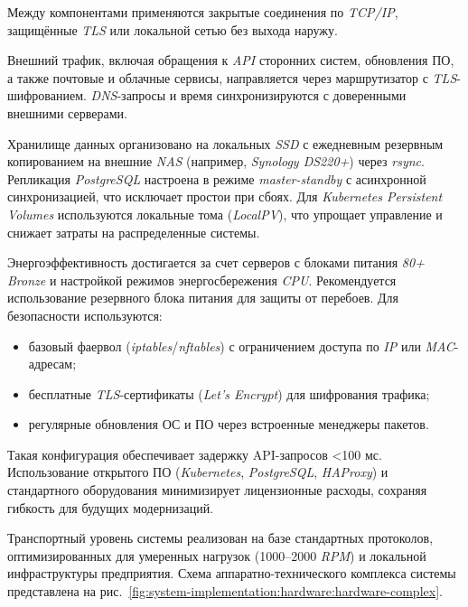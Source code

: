 Между компонентами применяются закрытые соединения по \textit{TCP/IP}, защищённые \textit{TLS} или локальной сетью без выхода наружу.

Внешний трафик, включая обращения к \textit{API} сторонних систем, обновления ПО, а также почтовые и облачные сервисы, направляется через маршрутизатор с \textit{TLS}-шифрованием. \textit{DNS}-запросы и время синхронизируются с доверенными внешними серверами.

Хранилище данных организовано на локальных \textit{SSD} с ежедневным резервным копированием на внешние \textit{NAS} (например, \textit{Synology DS220+}) через \textit{rsync}. Репликация \textit{PostgreSQL} настроена в режиме \textit{master-standby} с асинхронной синхронизацией, что исключает простои при сбоях. Для \textit{Kubernetes Persistent Volumes} используются локальные тома (\textit{LocalPV}), что упрощает управление и снижает затраты на распределенные системы.

Энергоэффективность достигается за счет серверов с блоками питания \textit{80+ Bronze} и настройкой режимов энергосбережения \textit{CPU}. Рекомендуется использование резервного блока питания для защиты от перебоев. Для безопасности используются:

\begin{itemize}
    \item базовый фаервол (\textit{iptables}/\textit{nftables}) с ограничением доступа по \textit{IP} или \textit{MAC}-адресам;
    \item бесплатные \textit{TLS}-сертификаты (\textit{Let’s Encrypt}) для шифрования трафика;
    \item регулярные обновления ОС и ПО через встроенные менеджеры пакетов.
\end{itemize}

Такая конфигурация обеспечивает задержку API-запросов <100 мс. Использование открытого ПО (\textit{Kubernetes}, \textit{PostgreSQL}, \textit{HAProxy}) и стандартного оборудования минимизирует лицензионные расходы, сохраняя гибкость для будущих модернизаций.

Транспортный уровень системы реализован на базе стандартных протоколов, оптимизированных для умеренных нагрузок (1000–2000 \textit{RPM}) и локальной инфраструктуры предприятия. Схема аппаратно-технического комплекса системы представлена на рис.~\ref{fig:system-implementation:hardware:hardware-complex}.

